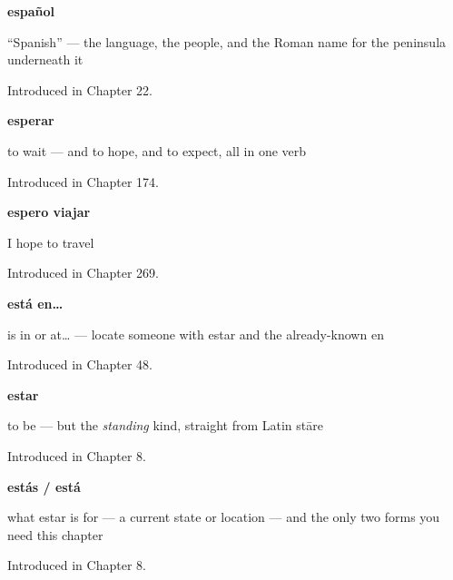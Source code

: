 \noindent\begin{minipage}[t]{\linewidth}
\raggedright
\textbf{español}\par
\small \textquotedblleft{}Spanish\textquotedblright{} — the language, the people, and the Roman name for the peninsula underneath it\par
\footnotesize Introduced in Chapter 22.
\end{minipage}\par\medskip

\noindent\begin{minipage}[t]{\linewidth}
\raggedright
\textbf{esperar}\par
\small to wait — and to hope, and to expect, all in one verb\par
\footnotesize Introduced in Chapter 174.
\end{minipage}\par\medskip

\noindent\begin{minipage}[t]{\linewidth}
\raggedright
\textbf{espero viajar}\par
\small I hope to travel\par
\footnotesize Introduced in Chapter 269.
\end{minipage}\par\medskip

\noindent\begin{minipage}[t]{\linewidth}
\raggedright
\textbf{está en…}\par
\small is in or at… — locate someone with estar and the already-known en\par
\footnotesize Introduced in Chapter 48.
\end{minipage}\par\medskip

\noindent\begin{minipage}[t]{\linewidth}
\raggedright
\textbf{estar}\par
\small to be — but the \emph{standing} kind, straight from Latin stāre\par
\footnotesize Introduced in Chapter 8.
\end{minipage}\par\medskip

\noindent\begin{minipage}[t]{\linewidth}
\raggedright
\textbf{estás / está}\par
\small what estar is for — a current state or location — and the only two forms you need this chapter\par
\footnotesize Introduced in Chapter 8.
\end{minipage}\par\medskip


